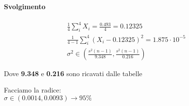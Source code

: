 \documentclass[]{article}
\begin{document}
    \paragraph{Svolgimento}
    \begin{equation*}
        \begin{aligned}
            \frac{1}{4} \sum_{i}^{4} X_i = \frac{0.493}{4} = 0.12325 \\
            \frac{1}{4-1} \sum_{i}^{4}\left ( X_i - 0.12325 \right )^2 = 1.875 \cdot 10^{-5} \\
            \sigma^2 \in \left ( \frac{s^2(n-1)}{9.348}, \frac{s^2(n-1)}{0.216} \right )
        \end{aligned} 
    \end{equation*}
    \centerline{Dove \textbf{9.348} e \textbf{0.216} sono ricavati dalle tabelle}
    Facciamo la radice: \\
    $\sigma \in (0.0014, 0.0093) \rightarrow 95\% $
\end{document}
